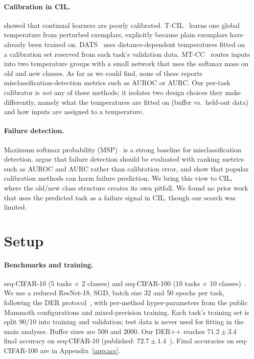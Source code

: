\documentclass[11pt]{article}
\begin{document}
\paragraph{Calibration in CIL.} \citet{li2024calibration} showed that continual learners are poorly
calibrated. T-CIL~\cite{hwang2025tcil} learns one global temperature from perturbed exemplars,
explicitly because plain exemplars have already been trained on. DATS~\cite{dats2025} uses
distance-dependent temperatures fitted on a calibration set reserved from each task's validation
data. MT-CC~\cite{mtcc2026} routes inputs into two temperature groups with a small network that
uses the softmax mass on old and new classes. As far as we could find, none of these reports
misclassification-detection metrics such as AUROC or AURC. Our per-task calibrator is \emph{not} any
of these methods; it isolates two design choices they make differently, namely what the
temperatures are fitted on (buffer vs.\ held-out data) and how inputs are assigned to a temperature.

\paragraph{Failure detection.} Maximum softmax probability (MSP)~\cite{hendrycks2017baseline} is a
strong baseline for misclassification detection. \citet{jaeger2023call} argue that failure
detection should be evaluated with ranking metrics such as AUROC and AURC rather than calibration
error, and \citet{zhu2022rethinking} show that popular calibration methods can harm failure
prediction. We bring this view to CIL, where the old/new class structure creates its own pitfall.
We found no prior work that uses the predicted task as a failure signal in CIL, though our search
was limited.

\section{Setup}\label{sec:setup}
\paragraph{Benchmarks and training.} seq-CIFAR-10 (5 tasks $\times$ 2 classes) and seq-CIFAR-100
(10 tasks $\times$ 10 classes)~\cite{krizhevsky2009learning}. We use a reduced ResNet-18, SGD,
batch size 32 and 50 epochs per task, following the DER protocol~\cite{buzzega2020dark}, with
per-method hyper-parameters from the public Mammoth configurations and mixed-precision training.
Each task's training set is split 90/10 into training and validation; test data is never used for
fitting in the main analyses. Buffer sizes are 500 and 2000. Our DER++ reaches $71.2\pm3.4$ final
accuracy on seq-CIFAR-10 (published: $72.7\pm1.4$~\cite{buzzega2020dark}). Final accuracies on
seq-CIFAR-100 are in Appendix~\ref{app:acc}.
\end{document}
